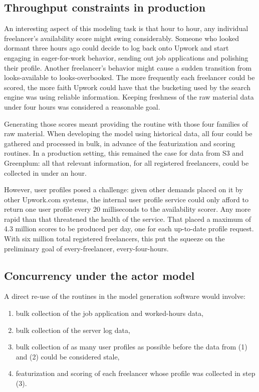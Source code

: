 \documentclass[tablecaption=bottom,wcp]{jmlr}
\begin{document}
\subsection{Throughput constraints in production}

 An interesting aspect of this modeling task is that hour to hour, any
individual freelancer's availability score might swing considerably. Someone who
looked dormant three hours ago could decide to log back onto Upwork and start
engaging in eager-for-work behavior, sending out job applications and polishing
their profile. Another freelancer's behavior might cause a sudden transition
from looks-available to looks-overbooked. The more frequently each freelancer
could be scored, the more faith Upwork could have that the bucketing used by the
search engine was using reliable information. Keeping freshness of the raw
material data under four hours was considered a reasonable goal.

 Generating those scores meant providing the routine with those four families of
raw material. When developing the model using historical data, all four could be
gathered and processed in bulk, in advance of the featurization and scoring
routines. In a production setting, this remained the case for data from S3 and
Greenplum: all that relevant information, for all registered freelancers, could
be collected in under an hour.

 However, user profiles posed a challenge: given other demands placed on it by
other Upwork.com systems, the internal user profile service could only afford to
return one user profile every 20 milliseconds to the availability scorer. Any
more rapid than that threatened the health of the service. That placed a maximum
of 4.3 million scores to be produced per day, one for each up-to-date profile
request. With six million total registered freelancers, this put the squeeze on
the preliminary goal of every-freelancer, every-four-hours.

\subsection{Concurrency under the actor model}

 A direct re-use of the routines in the model generation software would involve:

\begin{enumerate}
\item bulk collection of the job application and worked-hours data,
\item bulk collection of the server log data,
 \item bulk collection of as many user profiles as possible before the data from
(1) and (2) could be considered stale,
 \item featurization and scoring of each freelancer whose profile was collected
in step (3).
\end{enumerate}
\end{document}
